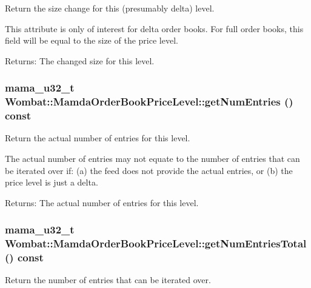 Return the size change for this (presumably delta) level. 

This attribute is only of interest for delta order books. For full order books, this field will be equal to the size of the price level.

\begin{Desc}
\item[Returns:]The changed size for this level. \end{Desc}
\hypertarget{classWombat_1_1MamdaOrderBookPriceLevel_a2e83c8a0e607cb5e73982573eb267f4}{
\subsubsection[getNumEntries]{\setlength{\rightskip}{0pt plus 5cm}mama\_\-u32\_\-t Wombat::Mamda\-Order\-Book\-Price\-Level::get\-Num\-Entries () const}}
\label{classWombat_1_1MamdaOrderBookPriceLevel_a2e83c8a0e607cb5e73982573eb267f4}


Return the actual number of entries for this level. 

The actual number of entries may not equate to the number of entries that can be iterated over if: (a) the feed does not provide the actual entries, or (b) the price level is just a delta.

\begin{Desc}
\item[Returns:]The actual number of entries for this level. \end{Desc}
\hypertarget{classWombat_1_1MamdaOrderBookPriceLevel_03be2fc007075d705a710103b77f3851}{
\subsubsection[getNumEntriesTotal]{\setlength{\rightskip}{0pt plus 5cm}mama\_\-u32\_\-t Wombat::Mamda\-Order\-Book\-Price\-Level::get\-Num\-Entries\-Total () const}}
\label{classWombat_1_1MamdaOrderBookPriceLevel_03be2fc007075d705a710103b77f3851}


Return the number of entries that can be iterated over. 

